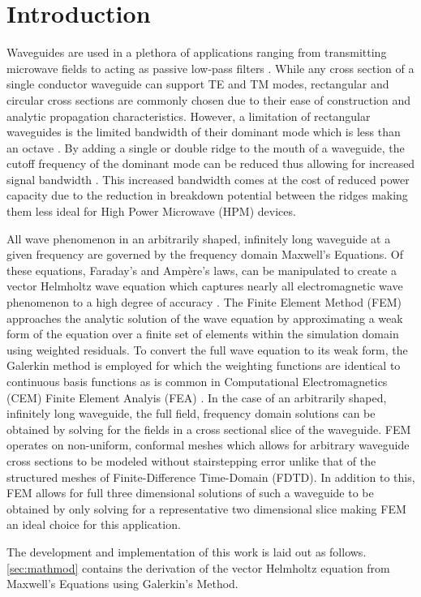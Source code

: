 \section{Introduction}
\label{sec:intro}

Waveguides are used in a plethora of applications ranging from transmitting microwave fields to acting as passive low-pass filters \cite{pozar2011microwave}. While any cross section of a single conductor waveguide can support TE and TM modes, rectangular and circular cross sections are commonly chosen due to their ease of construction and analytic propagation characteristics. However, a limitation of rectangular waveguides is the limited bandwidth of their dominant mode which is less than an octave \cite{pozar2011microwave}. By adding a single or double ridge to the mouth of a waveguide, the cutoff frequency of the dominant mode can be reduced thus allowing for increased signal bandwidth \cite{pozar2011microwave}. This increased bandwidth comes at the cost of reduced power capacity due to the reduction in breakdown potential between the ridges \cite{pozar2011microwave} making them less ideal for High Power Microwave (HPM) devices.  

All wave phenomenon in an arbitrarily shaped, infinitely long waveguide at a given frequency are governed by the frequency domain Maxwell's Equations. Of these equations, Faraday's and Amp\`{e}re's laws, can be manipulated to create a vector Helmholtz wave equation which captures nearly all electromagnetic wave phenomenon to a high degree of accuracy \cite{rothlecnotes}. The Finite Element Method (FEM) approaches the analytic solution of the wave equation by approximating a weak form of the equation over a finite set of elements within the simulation domain using weighted residuals. To convert the full wave equation to its weak form, the Galerkin method is employed for which the weighting functions are identical to continuous basis functions as is common in Computational Electromagnetics (CEM) Finite Element Analyis (FEA) \cite{rothlecnotes}. In the case of an arbitrarily shaped, infinitely long waveguide, the full field, frequency domain solutions can be obtained by solving for the fields in a cross sectional slice of the waveguide. FEM operates on non-uniform, conformal meshes which allows for arbitrary waveguide cross sections to be modeled without stairstepping error unlike that of the structured meshes of Finite-Difference Time-Domain (FDTD). In addition to this, FEM allows for full three dimensional solutions of such a waveguide to be obtained by only solving for a representative two dimensional slice making FEM an ideal choice for this application.

The development and implementation of this work is laid out as follows. \ref{sec:mathmod} contains the derivation of the vector Helmholtz equation from Maxwell's Equations using Galerkin's Method. 